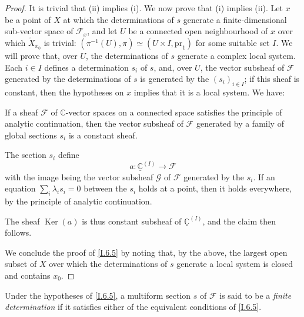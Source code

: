 \documentclass{report}
\theoremstyle{plain}
\newenvironment{lemma}[1]
    {\renewcommand\theinnercustomlemma{#1}\innercustomlemma}
    {\endinnercustomlemma}
\theoremstyle{definition}
\newenvironment{definition}[1]
    {\renewcommand\theinnercustomdefinition{#1}\innercustomdefinition}
    {\endinnercustomdefinition}
\newcommand{\sh}[1]{{\mathscr{#1}}}
\newcommand{\CC}{\mathbb{C}}
\newcommand{\pr}{\mathrm{pr}}
\DeclareMathOperator{\Ker}{Ker}
\newcommand{\oldpage}[1]{\marginpar{\footnotesize$\Big\vert$ \textit{p.~#1}}}
\begin{document}
\oldpage{38}
\begin{proof}
  It is trivial that (ii) implies (i).
  We now prove that (i) implies (ii).
  Let $x$ be a point of $X$ at which the determinations of $s$ generate a finite-dimensional sub-vector space of $\sh{F}_x$, and let $U$ be a connected open neighbourhood of $x$ over which $\widetilde{X}_{x_0}$ is trivial: $(\pi^{-1}(U),\pi) \simeq (U\times I,\pr_1)$ for some suitable set $I$.
  We will prove that, over $U$, the determinations of $s$ generate a complex local system.
  Each $i\in I$ defines a determination $s_i$ of $s$, and, over $U$, the vector subsheaf of $\sh{F}$ generated by the determinations of $s$ is generated by the $(s_i)_{i\in I}$;
  if this sheaf is constant, then the hypotheses on $x$ implies that it is a local system.
  We have:

  \begin{lemma}{6.6}
  \label{I.6.6}
    If a sheaf $\sh{F}$ of $\CC$-vector spaces on a connected space satisfies the principle of analytic continuation, then the vector subsheaf of $\sh{F}$ generated by a family of global sections $s_i$ is a constant sheaf.
  \end{lemma}

  The section $s_i$ define
  \[
    a\colon\underline{\CC}^{(I)}\to\sh{F}
  \]
  with the image being the vector subsheaf $\sh{G}$ of $\sh{F}$ generated by the $s_i$.
  If an equation $\sum_i\lambda_i s_i=0$ between the $s_i$ holds at a point, then it holds everywhere, by the principle of analytic continuation.

  The sheaf $\Ker(a)$ is thus constant subsheaf of $\underline{\CC}^{(I)}$, and the claim then follows.

  We conclude the proof of \cref{I.6.5} by noting that, by the above, the largest open subset of $X$ over which the determinations of $s$ generate a local system is closed and contains $x_0$.
\end{proof}

\begin{definition}{6.7}
\label{I.6.7}
  Under the hypotheses of \cref{I.6.5}, a multiform section $s$ of $\sh{F}$ is said to be a \emph{finite determination} if it satisfies either of the equivalent conditions of \cref{I.6.5}.
\end{definition}
\end{document}
